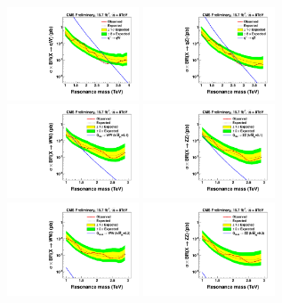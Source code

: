 \begin{figure}[h!tpb]
\begin{center}
\includegraphics[width=0.35\textwidth]{figs/limits/brazilianFlag_qW_high_purity.pdf}
\includegraphics[width=0.35\textwidth]{figs/limits/brazilianFlag_qZ_high_purity.pdf}\\
\includegraphics[width=0.35\textwidth]{figs/limits/brazilianFlag_RS1WW_high_purity.pdf}
\includegraphics[width=0.35\textwidth]{figs/limits/brazilianFlag_RS1ZZ_high_purity.pdf}\\
\includegraphics[width=0.35\textwidth]{figs/limits/brazilianFlag_BulkWW_high_purity.pdf}
\includegraphics[width=0.35\textwidth]{figs/limits/brazilianFlag_BulkZZ_high_purity.pdf}\\

\end{center}
\end{figure}
